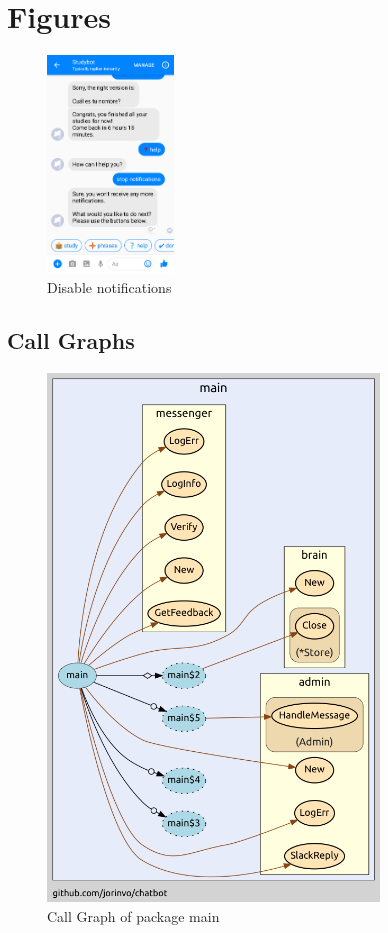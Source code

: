 \appendix

\chapter{Figures}


\begin{figure}[H]
  \centering
  \includegraphics[width=0.3\textwidth]{images/interface/10-disable-notify.png}
	\caption{Disable notifications}
	\label{fig:10-disable-notify}
\end{figure}


\section{Call Graphs}

\begin{figure}[H]
  \centering
  \includegraphics[height=14cm]{images/call-graph-main.png}
	\caption{Call Graph of package main}
  \label{a:call-graph}
\end{figure}

